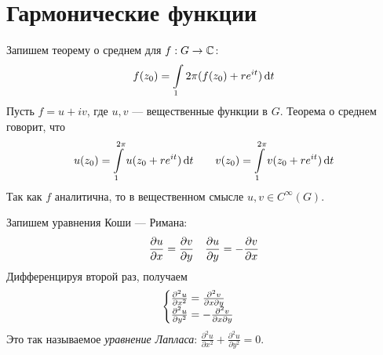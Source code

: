 \documentclass[a4paper]{report}
\begin{document}
    \section{Гармонические функции}
    Запишем теорему о среднем для $f: G \rightarrow \mathbb{C}$:
    \[f(z_0) = \int\limits_{1}{2\pi}(f(z_0) + r e^{it})\operatorname{d}\! t\]
    Пусть $f = u + iv$, где $u, v$ --- вещественные функции в $G$.
    Теорема о среднем говорит, что
    \[u(z_0) = \int\limits_{1}^{2\pi}u(z_0 + r e^{it})\operatorname{d}\! t \qquad v(z_0) = \int\limits_{1}^{2\pi}v(z_0 + r e^{it})\operatorname{d}\! t\]
    Так как $f$ аналитична, то в вещественном смысле $u, v \in C^{\infty}(G)$.

    Запишем уравнения Коши --- Римана:
    \[\frac{\partial u}{\partial x} = \frac{\partial v}{\partial y} \quad \frac{\partial u}{\partial y} = -\frac{\partial v}{\partial x}\]
    Дифференцируя второй раз, получаем \[\begin{cases}\frac{\partial^2 u}{\partial x^2} = \frac{\partial^2 v}{\partial x \partial y} \\ \frac{\partial^2 u}{\partial y^2} = -\frac{\partial^2 v}{\partial x \partial y}\end{cases}\]
    Это так называемое \emph{уравнение Лапласа}: $\frac{\partial^2 u}{\partial x^2} + \frac{\partial^2 u}{\partial y^2} = 0$.
\end{document}
